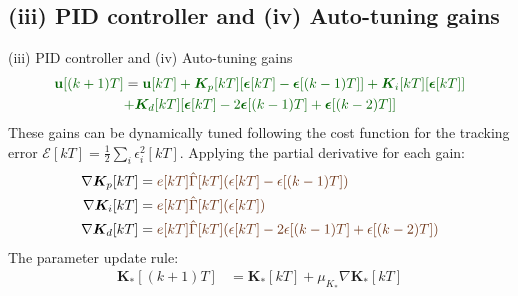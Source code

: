 \documentclass{beamer}
\begin{document}


\subsection{(iii) PID controller and (iv) Auto-tuning gains}
 
\begin{frame}{(iii) PID controller and (iv) Auto-tuning gains}
\vspace{-0.5cm}
\begin{align}
    \label{eq:control law}
    \textcolor{verde}{\mathbf{u}[(k+1)T]} &= \textcolor{verde}{\mathbf{u}[kT] + \bm{K}_p[kT][\boldsymbol{\epsilon}[kT] - \boldsymbol{\epsilon}[(k-1)T]] + \bm{K}_i[kT][\boldsymbol{\epsilon}[kT]]} \nonumber \\ 
    & \textcolor{verde}{+ \bm{K}_d[kT][\boldsymbol{\epsilon}[kT] - 2\boldsymbol{\epsilon}[(k-1)T] + \boldsymbol{\epsilon}[(k-2)T]] }
\end{align}
   These gains can be dynamically tuned following the cost function for the tracking error $\mathcal{E}[kT] = \frac{1}{2} \sum_i \epsilon_i^2[kT]$.
Applying the partial derivative for each gain:
\begin{align*}
        \nabla \bm{K}_p[kT] &=  \textcolor{auburn}{e[kT] \hat{\Gamma}[kT](\epsilon[kT]-\epsilon[(k-1)T])}\\
        \nabla \bm{K}_i [kT] &=  \textcolor{auburn}{e[kT] \hat{\Gamma}[kT](\epsilon[kT])}\\
        \nabla \bm{K}_d [kT] &=  \textcolor{auburn}{e[kT] \hat{\Gamma}[kT](\epsilon[kT]-2 \epsilon[(k-1)T]  + \epsilon[(k-2)T])}
\end{align*} 
The parameter update rule:
\begin{align}
\bm{K}_{*} [(k+1)T] &= \bm{K}_{*} [kT] + \mu_{K_{*}} \nabla \bm{K}_{*} [kT]
\end{align}

\end{frame}

\end{document}
